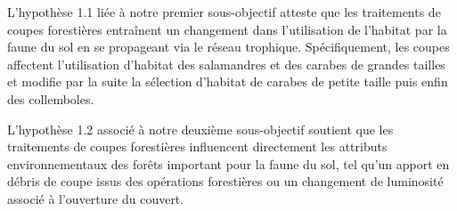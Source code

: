 L'hypothèse 1.1 liée à notre premier sous-objectif atteste que les traitements de coupes forestières entraînent un changement dans l'utilisation de l'habitat par la faune du sol en se propageant via le réseau trophique. 
Spécifiquement, les coupes affectent l'utilisation d'habitat des salamandres et des carabes de grandes tailles et modifie par la suite la sélection d'habitat de carabes de petite taille puis enfin des collemboles. 

L'hypothèse 1.2 associé à notre deuxième sous-objectif soutient que les traitements de coupes forestières influencent directement les attributs environnementaux des forêts important pour la faune du sol, 
tel qu'un apport en débris de coupe issus des opérations forestières ou un changement de luminosité associé à l'ouverture du couvert.


\cleardoublepage



